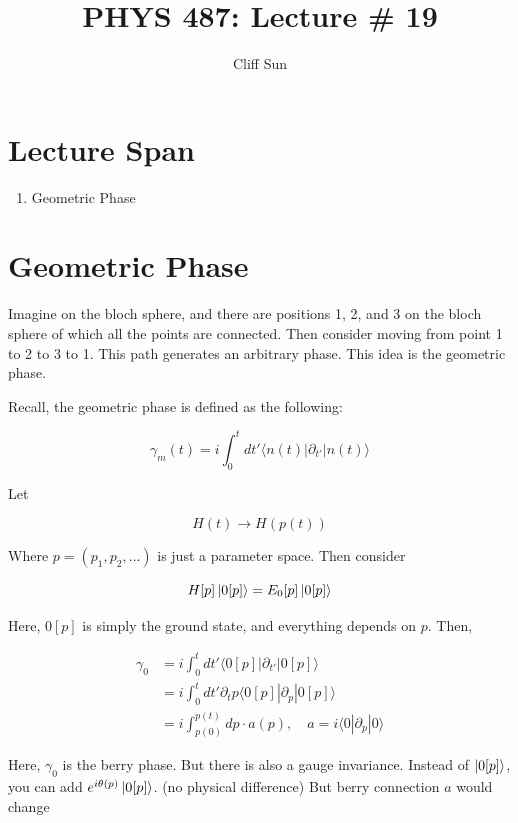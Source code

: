 \documentclass{article}
\title{PHYS 487: Lecture \# 19}
\author{Cliff Sun}
\newtheorem{one minute paper}[theorem]{One Minute Paper}
\begin{document}
\maketitle

\section*{Lecture Span}
\begin{enumerate}
    \item Geometric Phase
\end{enumerate}

\section*{Geometric Phase}

Imagine on the bloch sphere, and there are positions 1, 2, and 3 on the bloch sphere of which all the points are connected. Then consider moving from point 1 to 2 to 3 to 1. This path 
generates an arbitrary phase. This idea is the geometric phase. 

Recall, the geometric phase is defined as the following:

\begin{equation}
    \gamma_m(t) = i\int_{0}^tdt' \langle n(t) | \partial_{t'} | n(t) \rangle
\end{equation}

Let 

\begin{equation}
    H(t) \rightarrow H(p(t))
\end{equation}

Where $p = (p_1, p_2, \dots)$ is just a parameter space. Then consider 

$$H[p]\ket{0[p]} = E_0[p]\ket{0[p]}$$

Here, $0[p]$ is simply the ground state, and everything depends on $p$. Then, 

\begin{align*}
    \gamma_0 &= i\int_{0}^t dt' \langle 0[p] | \partial_{t'} | 0[p] \rangle \\
    &= i\int_{0}^t dt' \partial_{t}p \langle 0[p] | \partial_{p} | 0[p] \rangle \\
    &= i \int_{ p(0)}^{p(t)}dp \cdot a(p), \quad a = i\langle 0 |\partial_p | 0 \rangle
\end{align*}

Here, $\gamma_0$ is the berry phase. But there is also a gauge invariance. Instead of $\ket{0[p]}$, you can add $e^{i\theta(p)}\ket{0[p]}$. (no physical difference) But berry connection $a$ would change 
\end{document}
